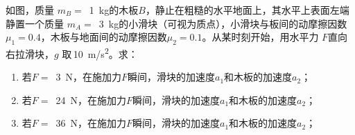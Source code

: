 如图，质量 \(m_B=\) \,\qty{1}{kg}的木板\(B\)，静止在粗糙的水平地面上，其水平上表面左端静置一个质量 \(m_A =\) \,\qty{3}{kg}的小滑块（可视为质点），小滑块与板间的动摩擦因数 \(\mu_1 = 0.4\)，木板与地面间的动摩擦因数\(\mu_2 = 0.1\)。从某时刻开始，用水平力 \(F\)直向右拉滑块，\(g\) 取\,\qty{10}{m/s^2}。求：
\begin{enumerate}
	\item 若\(F =\) \,\qty{3}{N}，在施加力\(F\)瞬间，滑块的加速度\(a_1\)和木板的加速度\(a_2\)；
	\item 若\(F =\) \,\qty{24}{N}，在施加力\(F\)瞬间，滑块的加速度\(a_1\)和木板的加速度\(a_2\)；
	\item 若\(F =\) \,\qty{36}{N}，在施加力\(F\)瞬间，滑块的加速度\(a_1\)和木板的加速度\(a_2\)；
\end{enumerate}

\begin{answer}
    
\end{answer}